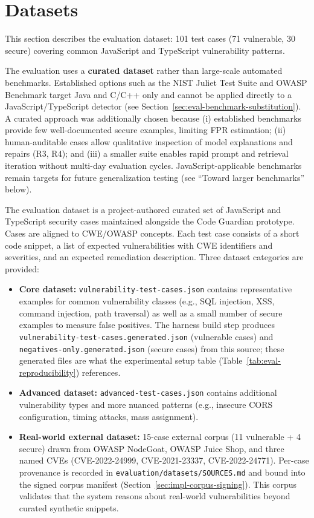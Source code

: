 \section{Datasets}
\label{sec:eval-dataset}

This section describes the evaluation dataset: 101 test cases (71 vulnerable, 30 secure) covering common JavaScript and TypeScript vulnerability patterns.

The evaluation uses a \textbf{curated dataset} rather than large-scale automated benchmarks. Established options such as the NIST Juliet Test Suite and OWASP Benchmark \cite{nistJuliet,owaspBenchmark} target Java and C/C++ only and cannot be applied directly to a JavaScript/TypeScript detector (see Section~\ref{sec:eval-benchmark-substitution}). A curated approach was additionally chosen because (i) established benchmarks provide few well-documented secure examples, limiting FPR estimation; (ii) human-auditable cases allow qualitative inspection of model explanations and repairs (R3, R4); and (iii) a smaller suite enables rapid prompt and retrieval iteration without multi-day evaluation cycles. JavaScript-applicable benchmarks remain targets for future generalization testing (see ``Toward larger benchmarks'' below).

The evaluation dataset is a project-authored curated set of JavaScript and TypeScript security cases maintained alongside the Code Guardian prototype. Cases are aligned to CWE/OWASP concepts. Each test case consists of a short code snippet, a list of expected vulnerabilities with CWE identifiers and severities, and an expected remediation description. Three dataset categories are provided:
\begin{itemize}
  \item \textbf{Core dataset:} \texttt{vulnerability-test-cases.json} contains representative examples for common vulnerability classes (e.g., SQL injection, XSS, command injection, path traversal) as well as a small number of secure examples to measure false positives. The harness build step produces \texttt{vulnerability-test-cases.generated.json} (vulnerable cases) and \texttt{negatives-only.generated.json} (secure cases) from this source; these generated files are what the experimental setup table (Table~\ref{tab:eval-reproducibility}) references.
  \item \textbf{Advanced dataset:} \texttt{advanced-test-cases.json} contains additional vulnerability types and more nuanced patterns (e.g., insecure CORS configuration, timing attacks, mass assignment).
  \item \textbf{Real-world external dataset:} 15-case external corpus (11 vulnerable + 4 secure) drawn from OWASP NodeGoat, OWASP Juice Shop, and three named CVEs (CVE-2022-24999, CVE-2021-23337, CVE-2022-24771). Per-case provenance is recorded in \texttt{evaluation/datasets/SOURCES.md} and bound into the signed corpus manifest (Section~\ref{sec:impl-corpus-signing}). This corpus validates that the system reasons about real-world vulnerabilities beyond curated synthetic snippets.
\end{itemize}

